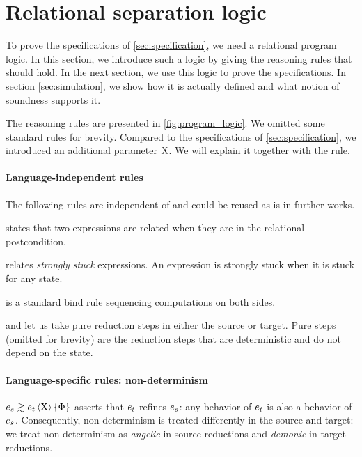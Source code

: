\section{Relational separation logic}
\label{sec:program_logic}

To prove the specifications of \cref{sec:specification}, we need a relational program logic.
In this section, we introduce such a logic by giving the reasoning rules that should hold.
In the next section, we use this logic to prove the specifications.
In section \cref{sec:simulation}, we show how it is actually defined and what notion of soundness supports it.

The reasoning rules are presented in \cref{fig:program_logic}.
We omitted some standard rules for brevity.
Compared to the specifications of \cref{sec:specification}, we introduced an additional parameter $\mathrm{X}$.
We will explain it together with the  rule.

\paragraph{Language-independent rules}
The following rules are independent of \DataLang and could be reused as is in further works.

 states that two expressions are related when they are in the relational postcondition.

 relates \emph{strongly stuck} expressions.
An expression is strongly stuck when it is stuck for any state.

 is a standard bind rule sequencing computations on both sides.

 and  let us take pure reduction steps in either the source or target.
Pure steps (omitted for brevity) are the reduction steps that are deterministic and do not depend on the state.

\paragraph{Language-specific rules: non-determinism}
$\iSimv[\iProt]{\iPred}{\datalangExpr_s}{\datalangExpr_t}$ asserts that $\datalangExpr_t$ refines $\datalangExpr_s$: any behavior of $\datalangExpr_t$ is also a behavior of $\datalangExpr_s$.
Consequently, non-determinism is treated differently in the source and target: we treat non-determinism as \emph{angelic} in source reductions and \emph{demonic} in target reductions.

